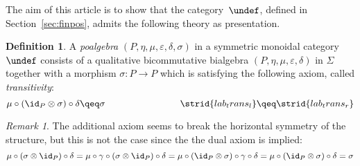 \documentclass[submission,copyright,creativecommons]{eptcs}
\let\P\undef
\let\C\undef
\theoremstyle{definition}
\newtheorem{definition}[theorem]{Definition}
\theoremstyle{remark}
\newtheorem{remark}[theorem]{Remark}
\begin{document}
The aim of this article is to show that the category~$\P$, defined in
Section~\ref{sec:finpos}, admits the following theory as presentation.

\begin{definition}
  A \emph{poalgebra} $(P,\eta,\mu,\varepsilon,\delta,\sigma)$ in a symmetric
  monoidal category $\C$ consists of a qualitative bicommutative bialgebra
  $(P,\eta,\mu,\varepsilon,\delta)$ in $\Sigma$ together with a morphism
  $\sigma:P\to P$ which is satisfying the following axiom, called
  \emph{transitivity}:
  \begin{equation}
    \label{eq:transitivity}
    \mu\circ(\id_P\otimes\sigma)\circ\delta\qeq\sigma
    \qquad\qquad\qquad\qquad
    \strid{lab_trans_l}\qeq\strid{lab_trans_r}
  \end{equation}
\end{definition}

\begin{remark}
  The additional axiom seems to break the horizontal symmetry of the structure,
  but this is not the case since the the dual axiom is implied:
  \[
  \mu\circ(\sigma\otimes\id_P)\circ\delta
  =\mu\circ\gamma\circ(\sigma\otimes\id_P)\circ\delta
  =\mu\circ(\id_P\otimes\sigma)\circ\gamma\circ\delta
  =\mu\circ(\id_P\otimes\sigma)\circ\delta
  =\sigma
  \]
\end{remark}
\end{document}
